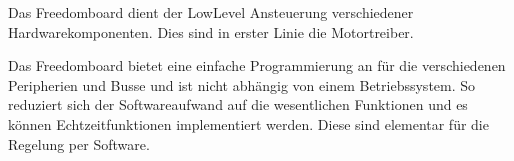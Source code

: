 Das Freedomboard dient der LowLevel Ansteuerung verschiedener
Hardwarekomponenten. Dies sind in erster Linie die Motortreiber.

Das Freedomboard bietet eine einfache Programmierung an für die
verschiedenen Peripherien und Busse und ist nicht abhängig von
einem Betriebssystem. So reduziert sich der Softwareaufwand auf
die wesentlichen Funktionen und es können Echtzeitfunktionen
implementiert werden. Diese sind elementar für die Regelung
per Software.
